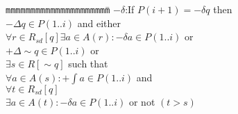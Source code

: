 

\begin{tabbing}
{\tt mmm}\={\tt mmmmmm}\={\tt mmmm}\={\tt mmmm}\={\tt mmmm}\=\kill
\>$-\delta$:\>If $P(i + 1) = - \delta q$ then \\
\>\>$-\Delta q \in P(1..i)$ and either\\
\>\>\>$\forall r \in R_{sd}[q] \exists a \in A(r): - \delta a \in P(1..i)$ or \\
\>\>\>$+ \Delta \sim q \in P(1..i)$ or \\
\>\>\>$\exists s \in R[\sim q]$  such that\\
\>\>\>\>$\forall a\in A(s): +\int a\in P(1..i)$ and \\
\>\>\>\>$\forall t\in R_{sd}[q]$ \\
\>\>\>\>\> $\exists a\in A(t): -\delta a\in P(1..i)$ or not $(t > s)$ 
\end{tabbing}
